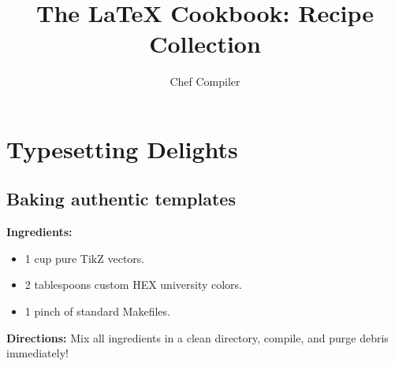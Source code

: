 \documentclass[11pt,a4paper]{report}
\title{\bfseries The LaTeX Cookbook: Recipe Collection}
\author{Chef Compiler}
\begin{document}
\maketitle

\chapter{Typesetting Delights}

\section{Baking authentic templates}
\textbf{Ingredients:}
\begin{itemize}
    \item 1 cup pure TikZ vectors.
    \item 2 tablespoons custom HEX university colors.
    \item 1 pinch of standard Makefiles.
\end{itemize}

\textbf{Directions:}
Mix all ingredients in a clean directory, compile, and purge debris immediately!
\end{document}
